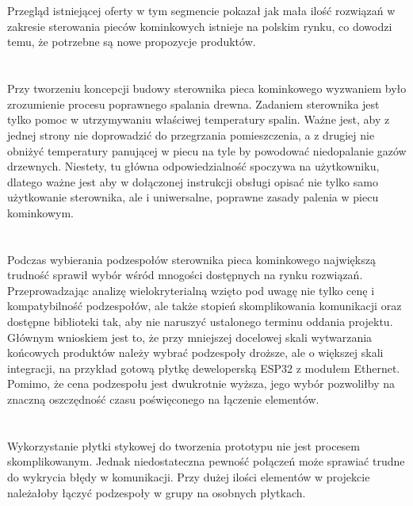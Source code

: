 \documentclass[11pt]{report}
\begin{document}
\section{}
Przegląd istniejącej oferty w tym segmencie pokazał jak mała ilość rozwiązań w zakresie sterowania pieców kominkowych istnieje na polskim rynku, co dowodzi temu, że potrzebne są nowe propozycje produktów.

\section{}
Przy tworzeniu koncepcji budowy sterownika pieca kominkowego wyzwaniem było zrozumienie procesu poprawnego spalania drewna. Zadaniem sterownika jest tylko pomoc w utrzymywaniu właściwej temperatury spalin. Ważne jest, aby z jednej strony nie doprowadzić do przegrzania pomieszczenia, a z drugiej nie obniżyć temperatury panującej w piecu na tyle by powodować niedopalanie gazów drzewnych. Niestety, tu główna odpowiedzialność spoczywa na użytkowniku, dlatego ważne jest aby w dołączonej instrukcji obsługi opisać nie tylko samo użytkowanie sterownika, ale i uniwersalne, poprawne zasady palenia w piecu kominkowym.

\section{}
Podczas wybierania podzespołów sterownika pieca kominkowego największą trudność sprawił wybór wśród mnogości dostępnych na rynku rozwiązań. Przeprowadzając analizę wielokryterialną wzięto pod uwagę nie tylko cenę i kompatybilność podzespołów, ale także stopień skomplikowania komunikacji oraz dostępne biblioteki tak, aby nie naruszyć ustalonego terminu oddania projektu.
Głównym wnioskiem jest to, że przy mniejszej docelowej skali wytwarzania końcowych produktów należy wybrać podzespoły droższe, ale o większej skali integracji, na przykład gotową płytkę deweloperską ESP32 z modułem Ethernet. Pomimo, że cena podzespołu jest dwukrotnie wyższa, jego wybór pozwoliłby na znaczną oszczędność czasu poświęconego na łączenie elementów.

\section{}
Wykorzystanie płytki stykowej do tworzenia prototypu nie jest procesem skomplikowanym. Jednak niedostateczna pewność połączeń może sprawiać trudne do wykrycia błędy w komunikacji.
Przy dużej ilości elementów w projekcie należałoby łączyć podzespoły w grupy na osobnych płytkach.
\end{document}
